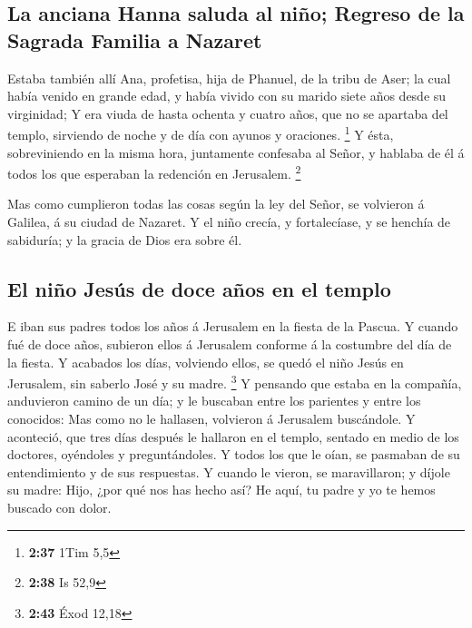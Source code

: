 \hypertarget{la-anciana-hanna-saluda-al-niuxf1o-regreso-de-la-sagrada-familia-a-nazaret}{%
\subsection{La anciana Hanna saluda al niño; Regreso de la Sagrada
Familia a
Nazaret}\label{la-anciana-hanna-saluda-al-niuxf1o-regreso-de-la-sagrada-familia-a-nazaret}}

 Estaba también allí Ana, profetisa, hija de Phanuel, de la
tribu de Aser; la cual había venido en grande edad, y había vivido con
su marido siete años desde su virginidad;  Y era viuda de
hasta ochenta y cuatro años, que no se apartaba del templo, sirviendo de
noche y de día con ayunos y oraciones. \footnote{\textbf{2:37} 1Tim 5,5}
 Y ésta, sobreviniendo en la misma hora, juntamente
confesaba al Señor, y hablaba de él á todos los que esperaban la
redención en Jerusalem. \footnote{\textbf{2:38} Is 52,9}

 Mas como cumplieron todas las cosas según la ley del
Señor, se volvieron á Galilea, á su ciudad de Nazaret.  Y
el niño crecía, y fortalecíase, y se henchía de sabiduría; y la gracia
de Dios era sobre él.

\hypertarget{el-niuxf1o-jesuxfas-de-doce-auxf1os-en-el-templo}{%
\subsection{El niño Jesús de doce años en el
templo}\label{el-niuxf1o-jesuxfas-de-doce-auxf1os-en-el-templo}}

 E iban sus padres todos los años á Jerusalem en la fiesta
de la Pascua.  Y cuando fué de doce años, subieron ellos á
Jerusalem conforme á la costumbre del día de la fiesta.  Y
acabados los días, volviendo ellos, se quedó el niño Jesús en Jerusalem,
sin saberlo José y su madre. \footnote{\textbf{2:43} Éxod 12,18}
 Y pensando que estaba en la compañía, anduvieron camino de
un día; y le buscaban entre los parientes y entre los conocidos:
 Mas como no le hallasen, volvieron á Jerusalem buscándole.
 Y aconteció, que tres días después le hallaron en el
templo, sentado en medio de los doctores, oyéndoles y preguntándoles.
 Y todos los que le oían, se pasmaban de su entendimiento y
de sus respuestas.  Y cuando le vieron, se maravillaron; y
díjole su madre: Hijo, ¿por qué nos has hecho así? He aquí, tu padre y
yo te hemos buscado con dolor.

